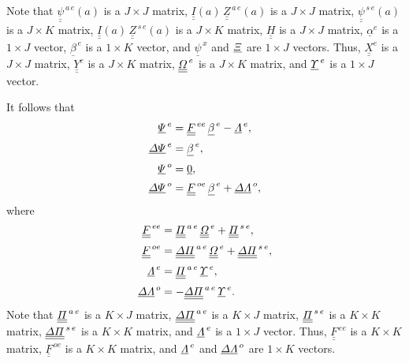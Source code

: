 \documentclass[12pt,prb,aps,notitlepage]{revtex4-1}
\begin{document}
Note that $\underline{\underline{\psi}}^{\,a\,e}(a)$ is a $J\times J$ matrix, $\underline{\underline{I}}(a)\,\underline{\underline{Z}}^{\,a\,e}(a)$  is a $J\times J$ matrix, 
$\underline{\underline{\psi}}^{\,s\,e}(a)$ is a $J\times K$ matrix, $\underline{\underline{I}}(a)\,\underline{\underline{Z}}^{\,s\,e}(a)$  is a $J\times K$ matrix, 
$\underline{\underline{H}}$ is a $J\times J$ matrix, $\underline{\alpha}^e$ is
a $1\times J$ vector,  $\underline{\beta}^{\,e}$ is a $1\times K$ vector, and $\underline{\psi}^{\,x}$ and $\underline{\mit\Xi}$   are $1\times J$ vectors. Thus, $\underline{\underline{X}}^e$ is a $J\times J$ matrix, $\underline{\underline{Y}}^e$
is a $J\times K$ matrix, $\underline{\underline{\mit\Omega}}^{\,e}$ is a $J\times K$ matrix, and  $\underline{\mit\Upsilon}^{\,e}$ is a $1\times J$ vector. 

It follows that
\begin{align}\label{e25}
\underline{\mit\Psi}^{\,e} &= \underline{\underline{F}}^{\,ee}\,\underline{\beta}^{\,e} - \underline{\mit\Lambda}^{\,e},\\[0.5ex]
\underline{\mit\Delta\Psi}^{\,e} &= \underline{\beta}^{\,e},\\[0.5ex]
\underline{\mit\Psi}^{\,o} &= \underline{0},\\[0.5ex]
\underline{\mit\Delta\Psi}^{\,o} &= \underline{\underline{F}}^{\,oe}\,\underline{\beta}^{\,e} + \underline{\mit\Delta\Lambda}^{\,o},\label{e28}
\end{align}
where
\begin{align}
\underline{\underline{F}}^{\,ee} &= \underline{\underline{\mit\Pi}}^{\,a\,e}\,\underline{\underline{\mit\Omega}}^{\,e} + \underline{\underline{\mit\Pi}}^{\,s\,e},\\[0.5ex]
\underline{\underline{F}}^{\,oe} &= \underline{\underline{\mit\Delta\Pi}}^{\,a\,e}\,\underline{\underline{\mit\Omega}}^{\,e} + \underline{\underline{\mit\Delta\Pi}}^{\,s\,e},\\[0.5ex]
\underline{\mit\Lambda}^{\,e}&= \underline{\underline{\mit\Pi}}^{\,a\,e}\,\underline{\mit\Upsilon}^{\,e},\\[0.5ex]
\underline{\mit\Delta\Lambda}^{\,o}&= -\underline{\underline{\mit\Delta\Pi}}^{\,a\,e}\,\underline{\mit\Upsilon}^{\,e}.
\end{align}
Note that  $\underline{\underline{\mit\Pi}}^{\,a\,e}$ is a $K\times J$ matrix, $\underline{\underline{\mit\Delta\Pi}}^{\,a\,e}$ is a $K\times J$ matrix, 
$\underline{\underline{\mit\Pi}}^{\,s\,e}$ is a $K\times K$ matrix, $\underline{\underline{\mit\Delta\Pi}}^{\,s\,e}$ is a $K\times K$ matrix, and $\underline{\mit\Lambda}^{\,e}$ is
a $1\times J$ vector. 
Thus, $\underline{\underline{F}}^{\,ee}$ is a $K\times K$ matrix, $\underline{\underline{F}}^{\,oe}$ is a $K\times K$ matrix, and $\underline{\mit\Lambda}^{\,e}$ and 
$\underline{\mit\Delta\Lambda}^{\,o}$ are $1\times K$ vectors. 
\end{document}
